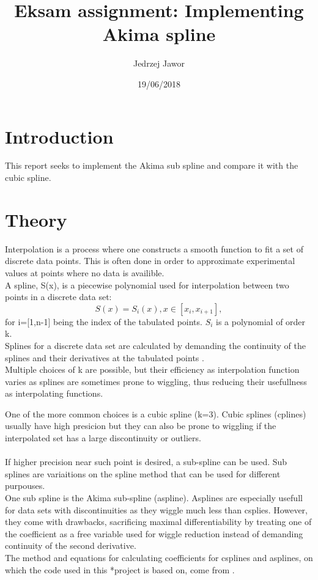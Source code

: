 \documentclass{article}
\begin{document}
\title{Eksam assignment: Implementing Akima spline}
\author{Jedrzej Jawor}
\date{19/06/2018}
\maketitle

\section{Introduction}
This report seeks to implement the Akima sub spline and compare it with the cubic spline.

\section{Theory}
Interpolation is a process where one constructs a smooth function to fit a set of discrete data points.
This is often done in order to approximate experimental values at points where no data is availible.
\\
A spline, S(x), is a piecewise polynomial used for interpolation between two points in a discrete data set:
\begin{equation}
\label{eq:spline}
S(x)=S_i(x), x \in [x_i,x_{i+1}],
\end{equation}
for i=[1,n-1] being the index of the tabulated points.
$S_i$ is a polynomial of order k.
\\
Splines for a discrete data set are calculated by demanding the continuity of the splines and their 
derivatives at the tabulated points \cite{Prakprog}.
\\
Multiple choices of k are possible, but their efficiency as interpolation function varies as splines are
sometimes prone to wiggling, thus reducing their usefullness as interpolating functions.

One of the more common choices is a cubic spline (k=3). Cubic splines (cplines) usually have high presicion 
but they can also be prone to wiggling if the interpolated set has a large discontinuity or outliers.
\\
\\
If higher precision near such point is desired, a sub-spline can be used. Sub splines are variaitions
 on the spline method that can be used for different purpouses.
\\
One sub spline is the Akima sub-spline (aspline).
Asplines are especially usefull for data sets with discontinuities as they wiggle much less 
than csplies. However, they come with drawbacks, sacrificing maximal differentiability by 
treating one of the coefficient as a free variable used for wiggle reduction instead of demanding continuity of 
the second derivative.
\\
The method and equations for calculating coefficients for csplines and asplines, on which the code used in this 
*project is based on, come from \cite{Prakprog}.
\end{document}

